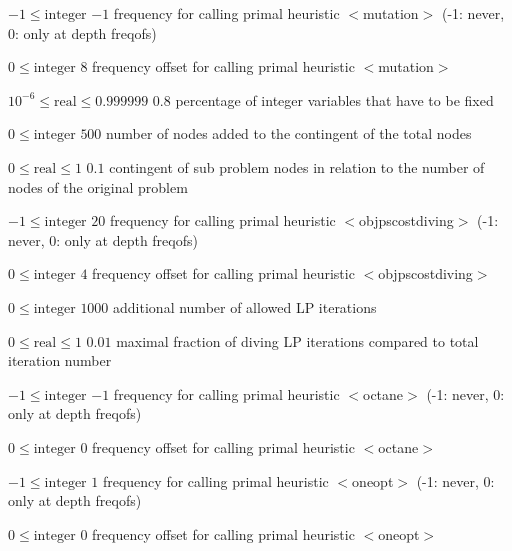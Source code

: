 %
{$-1\leq\textrm{integer}$}%
{$-1$}%
{frequency for calling primal heuristic $<$mutation$>$ (-1: never, 0: only at depth freqofs)}%
{}

%
{$0\leq\textrm{integer}$}%
{$8$}%
{frequency offset for calling primal heuristic $<$mutation$>$}%
{}

%
{$10^{- 6}\leq\textrm{real}\leq0.999999$}%
{$0.8$}%
{percentage of integer variables that have to be fixed }%
{}

%
{$0\leq\textrm{integer}$}%
{$500$}%
{number of nodes added to the contingent of the total nodes}%
{}

%
{$0\leq\textrm{real}\leq1$}%
{$0.1$}%
{contingent of sub problem nodes in relation to the number of nodes of the original problem}%
{}

%
{$-1\leq\textrm{integer}$}%
{$20$}%
{frequency for calling primal heuristic $<$objpscostdiving$>$ (-1: never, 0: only at depth freqofs)}%
{}

%
{$0\leq\textrm{integer}$}%
{$4$}%
{frequency offset for calling primal heuristic $<$objpscostdiving$>$}%
{}

%
{$0\leq\textrm{integer}$}%
{$1000$}%
{additional number of allowed LP iterations}%
{}

%
{$0\leq\textrm{real}\leq1$}%
{$0.01$}%
{maximal fraction of diving LP iterations compared to total iteration number}%
{}

%
{$-1\leq\textrm{integer}$}%
{$-1$}%
{frequency for calling primal heuristic $<$octane$>$ (-1: never, 0: only at depth freqofs)}%
{}

%
{$0\leq\textrm{integer}$}%
{$0$}%
{frequency offset for calling primal heuristic $<$octane$>$}%
{}

%
{$-1\leq\textrm{integer}$}%
{$1$}%
{frequency for calling primal heuristic $<$oneopt$>$ (-1: never, 0: only at depth freqofs)}%
{}

%
{$0\leq\textrm{integer}$}%
{$0$}%
{frequency offset for calling primal heuristic $<$oneopt$>$}%
{}

